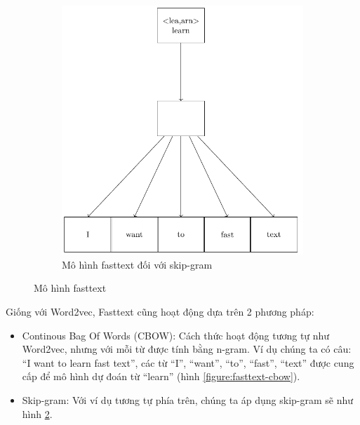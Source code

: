 \begin{figure}[htb]
\begin{subfigure}[t]{0.5\textwidth}
        \includegraphics[width=\textwidth]{tikz_image/fasttext_skipgram.pdf}
        \caption{Mô hình fasttext đối với skip-gram \cite{webpage14}}
        \label{figure:fasttext-skip-gram}
    \end{subfigure}
    \caption{Mô hình fasttext}
\end{figure}

Giống với Word2vec, Fasttext cũng hoạt động dựa trên 2 phương pháp:
\begin{itemize}
    \item Continous Bag Of Words (CBOW): Cách thức hoạt động tương tự như Word2vec, nhưng với mỗi từ được tính bằng n-gram. Ví dụ chúng ta có câu: ``I want to learn fast text'', các từ ``I'', ``want'', ``to'', ``fast'', ``text'' được cung cấp để mô hình dự đoán từ ``learn'' (hình \ref{figure:fasttext-cbow}).
    \item Skip-gram: Với ví dụ tương tự phía trên, chúng ta áp dụng skip-gram sẽ như hình \ref{figure:fasttext-skip-gram}.
\end{itemize}
